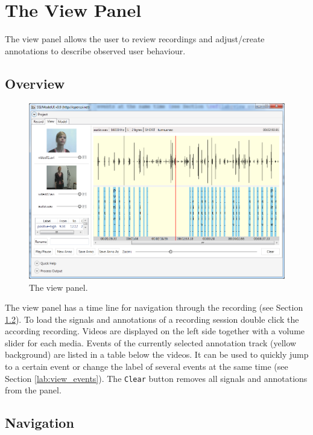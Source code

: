 \chapter{The View Panel}\label{lab:view}

The view panel allows the user to review recordings and adjust/create annotations to describe observed user behaviour.

\section{Overview}\label{lab:view_stimuli}

\begin{figure}[h]
\begin{center}
\includegraphics[scale=0.5]{pics/view_gui.png}
\end{center}
\vspace{-0.5cm}
\caption{The view panel.}
\label{fig:view_gui}
\end{figure}

The view panel has a time line for navigation through the recording (see Section \ref{lab:view_navigate}). To load the signals and annotations of a recording session double click the according recording. Videos are displayed on the left side together with a volume slider for each media. Events of the currently selected annotation track (yellow background) are listed in a table below the videos. It can be used to quickly jump to a certain event or change the label of several events at the same time (see Section \ref{lab:view_events}). The \texttt{Clear} button removes all signals and annotations from the panel.

\section{Navigation}\label{lab:view_navigate}

